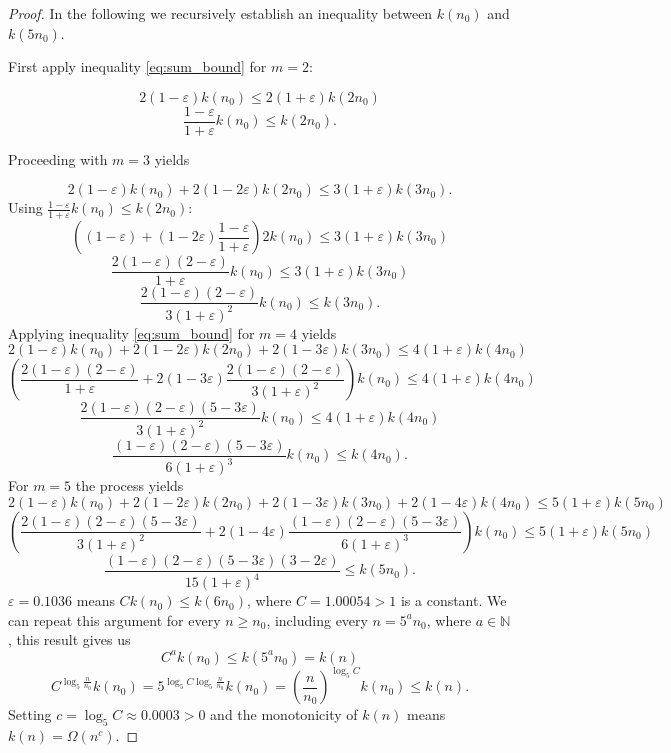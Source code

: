\documentclass[10pt,a4paper]{amsart}
\newcommand{\nn}{\mathbb{N}}
\begin{document}
\begin{proof}
In the following we recursively establish an inequality between $k(n_0)$ and $k(5n_0)$.

First apply inequality \ref{eq:sum_bound} for $m=2$:

$$2(1-\varepsilon)k(n_0)\le2(1+\varepsilon)k(2n_0)$$
$$\frac{1-\varepsilon}{1+\varepsilon}k(n_0)\le k(2n_0).$$

Proceeding with $m=3$ yields

$$2(1-\varepsilon)k(n_0)+2(1-2\varepsilon)k(2n_0)\le3(1+\varepsilon)k(3n_0).$$
Using $\frac{1-\varepsilon}{1+\varepsilon}k(n_0)\le k(2n_0)$:
$$\left((1-\varepsilon)+(1-2\varepsilon)\frac{1-\varepsilon}{1+\varepsilon}\right)2k(n_0)\le 3(1+\varepsilon)k(3n_0)$$
$$\frac{2(1-\varepsilon)(2-\varepsilon)}{1+\varepsilon}k(n_0)\le 3(1+\varepsilon)k(3n_0)$$
$$\frac{2(1-\varepsilon)(2-\varepsilon)}{3(1+\varepsilon)^2}k(n_0)\le k(3n_0).$$
Applying inequality \ref{eq:sum_bound} for $m=4$ yields
$$2(1-\varepsilon)k(n_0)+2(1-2\varepsilon)k(2n_0)+2(1-3\varepsilon)k(3n_0)\le4(1+\varepsilon)k(4n_0)$$
$$\left(\frac{2(1-\varepsilon)(2-\varepsilon)}{1+\varepsilon}+2(1-3\varepsilon)\frac{2(1-\varepsilon)(2-\varepsilon)}{3(1+\varepsilon)^2}\right)k(n_0)\le4(1+\varepsilon)k(4n_0)$$
$$\frac{2(1-\varepsilon)(2-\varepsilon)(5-3\varepsilon)}{3(1+\varepsilon)^2}k(n_0)\le 4(1+\varepsilon)k(4n_0)$$
$$\frac{(1-\varepsilon)(2-\varepsilon)(5-3\varepsilon)}{6(1+\varepsilon)^3}k(n_0)\le k(4n_0).$$
For $m=5$ the process yields
$$2(1-\varepsilon)k(n_0)+2(1-2\varepsilon)k(2n_0)+2(1-3\varepsilon)k(3n_0)+2(1-4\varepsilon)k(4n_0)\le5(1+\varepsilon)k(5n_0)$$
$$\left(\frac{2(1-\varepsilon)(2-\varepsilon)(5-3\varepsilon)}{3(1+\varepsilon)^2}+2(1-4\varepsilon)\frac{(1-\varepsilon)(2-\varepsilon)(5-3\varepsilon)}{6(1+\varepsilon)^3}\right)k(n_0)\le 5(1+\varepsilon)k(5n_0)$$
$$\frac{(1-\varepsilon)(2-\varepsilon)(5-3\varepsilon)(3-2\varepsilon)}{15(1+\varepsilon)^4}\le k(5n_0).$$
$\varepsilon=0.1036$ means $Ck(n_0)\le k(6n_0)$, where $C=1.00054>1$ is a constant. We can repeat this argument for every $n\ge n_0$, including every $n=5^an_0$, where $a\in\nn$, this result gives us 
$$C^ak(n_0)\le k(5^an_0)=k(n)$$
$$C^{\log_5\frac{n}{n_0}}k(n_0)=5^{\log_5C\log_5\frac{n}{n_0}}k(n_0)=\left(\frac{n}{n_0}\right)^{\log_5C}k(n_0)\le k(n).$$
Setting $c=\log_5C\approx 0.0003>0$ and the monotonicity of $k(n)$ means $k(n)=\Omega(n^c)$.
    
\end{proof}
\end{document}
